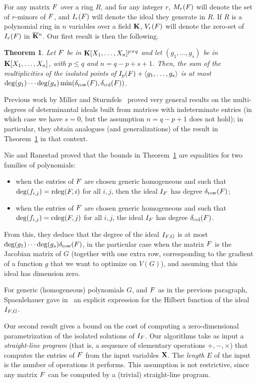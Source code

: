 \documentclass[12pt]{article}
\newtheorem{theorem}[definition]{Theorem}
\begin{document}
For any matrix ${F}$ over a ring $R$, and for any integer $r$,
$M_r({F})$ will denote the set of $r$-minors of ${F}$, and $I_r({F})$
will denote the ideal they generate in $R$. If $R$ is a polynomial
ring in $n$ variables over a field $\mathbf{K}$, $V_r({F})$ will denote the
zero-set of $I_r({F})$ in $\overline{\mathbf{K}}{}^n$. Our first result is then the
following.
\begin{theorem}\label{theo:1}
  Let ${F}$ be in $\mathbf{K}[X_1,\dots,X_n]^{p \times q}$ and let
  $(g_1,\dots,g_s)$ be in $\mathbf{K}[X_1,\dots,X_n]$, with $p \le q$ and
  $n=q-p+s+1$. Then, the sum of the multiplicities of the isolated
  points of $I_p({F}) + \langle g_1,\dots,g_s \rangle$ is at most
  $\deg(g_1) \cdots \deg(g_s) \min(\delta_{\rm row}({F}), \delta_{\rm
    col}({F}))$.
\end{theorem}
Previous work by Miller and Sturmfels~\cite[Chapter~15]{MiSt04} proved
very general results on the multi-degrees of determinantal ideals
built from matrices with indeterminate entries (in which case we have
$s=0$, but the assumption $n=q-p+1$ does not hold); in particular,
they obtain analogues (and generalizations) of the result in
Theorem~\ref{theo:1} in that context.

Nie and Ranestad proved that the bounds in Theorem~\ref{theo:1} are
equalities for two families of polynomials:
\begin{itemize}
\item when the entries of ${F}$ are chosen generic homogeneous and
  such that $\deg(f_{i,j}) = \mathrm{rdeg}({F},i)$ for all $i,j$, then the
  ideal $I_{{F}}$ has degree $\delta_{\rm row}({F})$;
\item when the entries of ${F}$ are chosen generic homogeneous and
  such that $\deg(f_{i,j}) = \mathrm{cdeg}({F},j)$ for all $i,j$, the ideal
  $I_{{F}}$ has degree $\delta_{\rm col}({F})$.
\end{itemize}
From this, they deduce that the degree of the ideal $I_{{F},G}$ is at
most $\deg(g_1) \cdots \deg(g_s) \delta_{\rm row}({F})$, in the
particular case when the matrix ${F}$ is the Jacobian matrix of $G$
(together with one extra row, corresponding to the gradient of a
function $g$ that we want to optimize on $V(G)$), and assuming that
this ideal has dimension zero.

For generic (homogeneous) polynomials $G$, and ${F}$ as in the
previous paragraph, Spaenlehauer gave in~\cite{Spa14} an explicit
expression for the Hilbert function of the ideal $I_{{F},G}$.


Our second result gives a bound on the cost of computing a
zero-dimensional parametrization of the isolated solutions of
$I_{{F}}$. Our algorithms take as input a \emph{straight-line program}
(that is, a sequence of elementary operations $+, -, \times$) that
computes the entries of ${F}$ from the input variables $\mathbf{X}$. The
\emph{length $E$} of the input is the number of operations it
performs. This assumption is not restrictive, since any matrix ${F}$
can be computed by a (trivial) straight-line program.
\end{document}
